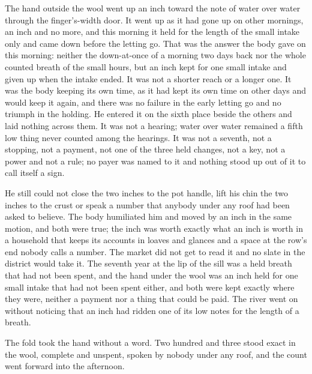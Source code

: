 The hand outside the wool went up an inch toward the note of water over water through the finger's-width door. It went up as it had gone up on other mornings, an inch and no more, and this morning it held for the length of the small intake only and came down before the letting go. That was the answer the body gave on this morning: neither the down-at-once of a morning two days back nor the whole counted breath of the small hours, but an inch kept for one small intake and given up when the intake ended. It was not a shorter reach or a longer one. It was the body keeping its own time, as it had kept its own time on other days and would keep it again, and there was no failure in the early letting go and no triumph in the holding. He entered it on the sixth place beside the others and laid nothing across them. It was not a hearing; water over water remained a fifth low thing never counted among the hearings. It was not a seventh, not a stopping, not a payment, not one of the three held changes, not a key, not a power and not a rule; no payer was named to it and nothing stood up out of it to call itself a sign.

He still could not close the two inches to the pot handle, lift his chin the two inches to the crust or speak a number that anybody under any roof had been asked to believe. The body humiliated him and moved by an inch in the same motion, and both were true; the inch was worth exactly what an inch is worth in a household that keeps its accounts in loaves and glances and a space at the row's end nobody calls a number. The market did not get to read it and no slate in the district would take it. The seventh year at the lip of the sill was a held breath that had not been spent, and the hand under the wool was an inch held for one small intake that had not been spent either, and both were kept exactly where they were, neither a payment nor a thing that could be paid. The river went on without noticing that an inch had ridden one of its low notes for the length of a breath.

The fold took the hand without a word. Two hundred and three stood exact in the wool, complete and unspent, spoken by nobody under any roof, and the count went forward into the afternoon.

